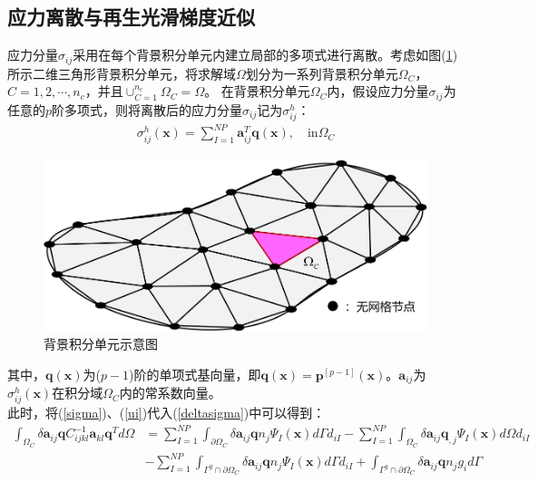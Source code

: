 \subsection{应力离散与再生光滑梯度近似}
应力分量$\sigma_{ij}$采用在每个背景积分单元内建立局部的多项式进行离散。考虑如图(\ref{background})所示二维三角形背景积分单元，将求解域$\Omega$划分为一系列背景积分单元$\Omega_C$，$C=1,2,\dotsb,n_c$，并且$\cup_{C=1}^{n_c}\Omega_C=\Omega$。
在背景积分单元$\Omega_C$内，假设应力分量$\sigma_{ij}$为任意的$p$阶多项式，则将离散后的应力分量$\sigma_{ij}$记为$\sigma^h_{ij}$：
\begin{equation}\label{sigma}
\begin{split}
    \sigma^h_{ij}(\pmb{x})=\sum_{I=1}^{N\!P}\pmb{a}_{ij}^T\pmb{q}(\pmb{x}),\quad\text{in}\Omega_C
\end{split}
\end{equation}
\begin{figure}[!h]
    \centering
    \includegraphics[scale=0.7]{figure/background.png}
    \caption{背景积分单元示意图}\label{background}
\end{figure}
其中，$\pmb{q}(\pmb{x})$为($p-1$)阶的单项式基向量，即$\pmb{q}(\pmb{x})=\pmb{p}^{[p-1]}(\pmb{x})$。$\pmb{a}_{ij}$为$\sigma_{ij}^h(\pmb{x})$在积分域$\Omega_C$内的常系数向量。\\
此时，将(\ref{sigma})、(\ref{ui})代入(\ref{deltasigma})中可以得到：
\begin{equation}
\begin{split}
    \int_{\Omega_C}\delta\pmb{a}_{ij}\pmb{q}C^{-1}_{ijkl}\pmb{a}_{kl}\pmb{q}^Td\Omega&=\sum_{I=1}^{N\!P}\int_{\partial\Omega_C}\delta\pmb{a}_{ij}\pmb{q}n_j\Psi_I(\pmb{x})d\Gamma d_{iI}-\sum_{I=1}^{N\!P}\int_{\Omega_C}\delta\pmb{a}_{ij}\pmb{q}_{,j}\Psi_{I}(\pmb{x})d\Omega d_{iI}\\
     &-\sum_{I=1}^{N\!P}\int_{\Gamma^g\cap\partial\Omega_C}\delta\pmb{a}_{ij}\pmb{q}n_j\Psi_I(\pmb{x})d\Gamma d_{iI}+\int_{\Gamma^g\cap\partial\Omega_C}\delta\pmb{a}_{ij}\pmb{q}n_jg_id\Gamma
\end{split}
\end{equation}
